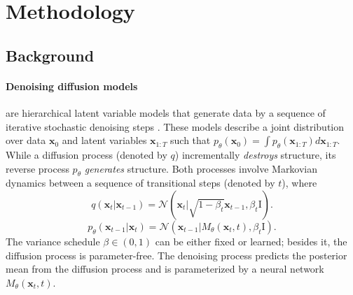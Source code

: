 \section{Methodology}

\subsection{Background}
\paragraph{\textbf{Denoising diffusion models}} are hierarchical latent variable models that generate data by a sequence of iterative stochastic denoising steps \cite{Sohl2015,Yang2019,Ho2020,Song2021}. These models describe a joint distribution over data $\boldsymbol{x}_0$ and latent variables $\boldsymbol{x}_{1:T}$ such that $p_\theta\left(\boldsymbol{x}_0\right)=\int p_\theta\left(\boldsymbol{x}_{1:T}\right)d\boldsymbol{x}_{1:T}$. While a diffusion process (denoted by $q$)  incrementally \textit{destroys} structure, its reverse process $p_\theta$ \textit{generates} structure. Both processes involve Markovian dynamics between a sequence of transitional steps (denoted by $t$), where
\begin{equation}\label{eq:forward}
    q\left(\boldsymbol{x}_t|\boldsymbol{x}_{t-1}\right)=\mathcal{N}\left(\boldsymbol{x}_t|\sqrt{1-\beta_t}\boldsymbol{x}_{t-1},\beta_t\boldsymbol{\mathrm{I}}\right).
\end{equation}
\begin{equation}\label{eq:reverse}
    p_\theta\left(\boldsymbol{x}_{t-1}|\boldsymbol{x}_t\right)=\mathcal{N}\left(\boldsymbol{x}_{t-1}|M_\theta\left(\boldsymbol{x}_t,t\right),\beta_t\boldsymbol{\mathrm{I}}\right).
\end{equation}
The variance schedule $\beta\in \left(0,1\right)$ can be either fixed or learned; besides it, the diffusion process is parameter-free. The denoising process predicts the posterior mean from the diffusion process and is parameterized by a neural network $M_\theta\left(\boldsymbol{x}_t,t\right)$.


